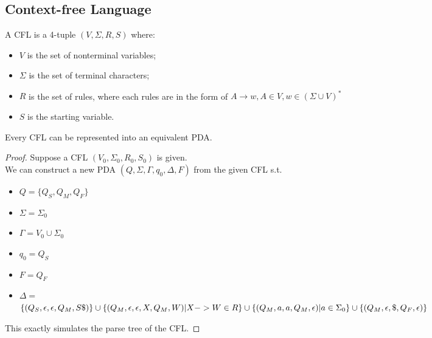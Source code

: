 \documentclass{report}
\begin{document}
		\subsection{Context-free Language}
			\begin{defn} \label{def_cfl}
				A CFL is a 4-tuple $(V,\Sigma,R,S)$ where:
				\begin{itemize}
					\item $V$ is the set of nonterminal variables;
					\item $\Sigma$ is the set of terminal characters;
					\item $R$ is the set of rules, where each rules are in the form of $A\rightarrow w, A\in V, w\in (\Sigma \cup V)^*$
					\item $S$ is the starting variable.
				\end{itemize}
			\end{defn}
		
			\begin{thm} \label{thm_cfl_pda_equivalence}
				Every CFL can be represented into an equivalent PDA.
			\end{thm}
		
			\begin{proof}
				Suppose a CFL $(V_0,\Sigma_0,R_0,S_0)$ is given.\\
				We can construct a new PDA $(Q,\Sigma,\Gamma,q_0,\Delta,F)$ from the given CFL s.t.
				\begin{itemize}
					\item $Q=\{Q_S,Q_M,Q_F\}$
					\item $\Sigma=\Sigma_0$
					\item $\Gamma=V_0 \cup \Sigma_0$
					\item $q_0=Q_S$
					\item $F=Q_F$
					\item $\Delta=$\\
					\begin{math}
					\{(Q_S,\epsilon,\epsilon,Q_M,S\$)\}\cup\\
					\{(Q_M,\epsilon,\epsilon,X,Q_M,W)|X->W \in R\}\cup\\
					\{(Q_M,a,a,Q_M,\epsilon)|a \in \Sigma_0\}\cup\\
					\{(Q_M,\epsilon,\$,Q_F,\epsilon)\}
					\end{math}
				\end{itemize}
				This exactly simulates the parse tree of the CFL.
			\end{proof}
	
\end{document}
